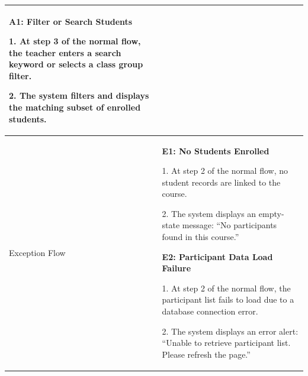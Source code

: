 {\begin{longtable}{|>{\bfseries\raggedright\arraybackslash}p{}|>{\raggedright\arraybackslash}p{}|}
\textbf{A1: Filter or Search Students}\par
1. At step 3 of the normal flow, the teacher enters a search keyword or selects a class group filter. \par
2. The system filters and displays the matching subset of enrolled students. \\ \hline
Exception Flow &
\textbf{E1: No Students Enrolled}\par
1. At step 2 of the normal flow, no student records are linked to the course.\par
2. The system displays an empty-state message: ``No participants found in this course.''\par\vspace{4pt}
\textbf{E2: Participant Data Load Failure}\par
1. At step 2 of the normal flow, the participant list fails to load due to a database connection error.\par
2. The system displays an error alert: ``Unable to retrieve participant list. Please refresh the page.'' \\ \hline
\end{longtable}
}

